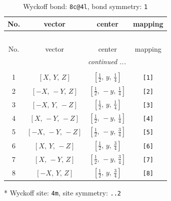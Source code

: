 \documentclass[fleqn,8pt]{jsarticle}
\begin{document}
\renewcommand{\arraystretch}{1.2}
\begin{longtable}{cccc}
\caption{Wyckoff bond: {\tt 8c@4l}, bond symmetry: {\tt 1}}
 \\
 \hline \hline
No. & vector & center & mapping \\ \hline \endfirsthead

\multicolumn{3}{l}{\tablename\ \thetable{}} \\
 \hline \hline
No. & vector & center & mapping \\ \hline \endhead

 \hline \hline
\multicolumn{3}{r}{\footnotesize\it continued ...} \\ \endfoot

 \hline \hline
\multicolumn{3}{r}{} \\ \endlastfoot

1 & $\left[ X,\, Y,\, Z \right]$ & $\left[ \frac{1}{2},\, y,\, \frac{1}{4} \right]$ & {\tt [1]} \\ \hline
2 & $\left[ - X,\, - Y,\, Z \right]$ & $\left[ \frac{1}{2},\, - y,\, \frac{1}{4} \right]$ & {\tt [2]} \\ \hline
3 & $\left[ - X,\, Y,\, - Z \right]$ & $\left[ \frac{1}{2},\, y,\, \frac{1}{4} \right]$ & {\tt [3]} \\ \hline
4 & $\left[ X,\, - Y,\, - Z \right]$ & $\left[ \frac{1}{2},\, - y,\, \frac{1}{4} \right]$ & {\tt [4]} \\ \hline
5 & $\left[ - X,\, - Y,\, - Z \right]$ & $\left[ \frac{1}{2},\, - y,\, \frac{3}{4} \right]$ & {\tt [5]} \\ \hline
6 & $\left[ X,\, Y,\, - Z \right]$ & $\left[ \frac{1}{2},\, y,\, \frac{3}{4} \right]$ & {\tt [6]} \\ \hline
7 & $\left[ X,\, - Y,\, Z \right]$ & $\left[ \frac{1}{2},\, - y,\, \frac{3}{4} \right]$ & {\tt [7]} \\ \hline
8 & $\left[ - X,\, Y,\, Z \right]$ & $\left[ \frac{1}{2},\, y,\, \frac{3}{4} \right]$ & {\tt [8]} \\
\end{longtable}
* Wyckoff site: {\tt 4m}, site symmetry: {\tt ..2}
\renewcommand{\arraystretch}{1.2}
\end{document}
